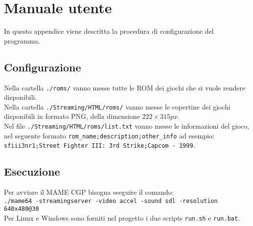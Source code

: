 \chapter{Manuale utente}
In questo appendice viene descritta la procedura di configurazione del programma.

\section{Configurazione}
Nella cartella \verb|./roms/| vanno messe tutte le ROM dei giochi che si vuole rendere disponibili.\\
Nella cartella \verb|./Streaming/HTML/roms/| vanno messe le copertine dei giochi disponibili in formato PNG, della dimensione $222 \times 315px$.\\
Nel file \verb|./Streaming/HTML/roms/list.txt| vanno messe le informazioni del gioco, nel seguente formato \verb|rom_name;description;other_info| ad esempio:\\ \verb|sfiii3nr1;Street Fighter III: 3rd Strike;Capcom - 1999|.

\section{Esecuzione}
Per avviare il MAME CGP bisogna eseguire il comando:\\
\verb|./mame64 -streamingserver -video accel -sound sdl -resolution 640x480@30|\\
Per Linux e Windows sono forniti nel progetto i due scripts \verb|run.sh| e \verb|run.bat|.